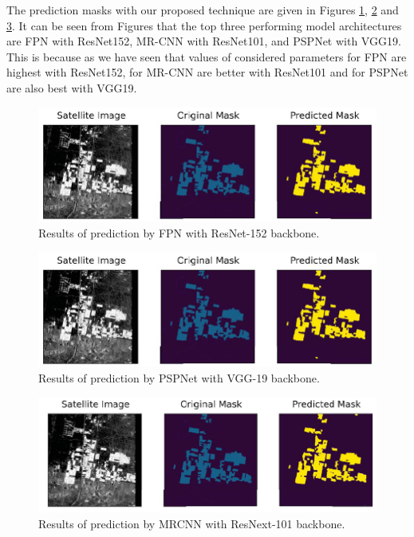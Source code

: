 \documentclass[a4paper,12pt]{spieman}  %
\begin{document}
\begin{spacing}{1}
\begin{table}[]
\label{tab:results2}
\end{table}
\egroup
\par The prediction masks with our proposed technique are given in Figures \ref{fig:fpn}, \ref{fig:psp} and \ref{fig:mrcnn}. It can be seen from Figures that the top three performing model architectures are FPN with ResNet152, MR-CNN with ResNet101, and PSPNet with VGG19. This is because as we have seen that values of considered parameters for FPN are highest with ResNet152, for MR-CNN are better with ResNet101 and for PSPNet are also best with VGG19. 
\begin{figure}[!h]
	\centering
	\includegraphics[width=\textwidth]{fpn.png}
	\caption{\label{fig:fpn}Results of prediction by FPN with ResNet-152 backbone.}
\end{figure}
\begin{figure}[!h]
	\centering
	\includegraphics[width=\textwidth]{fpn.png}
	\caption{\label{fig:psp}Results of prediction by PSPNet with VGG-19 backbone.}
\end{figure}
\begin{figure}[!h]
	\centering
	\includegraphics[width=\textwidth]{mrcnn.png}
	\caption{\label{fig:mrcnn}Results of prediction by MRCNN with ResNext-101 backbone.}

\end{figure}
\end{spacing}
\end{document}
